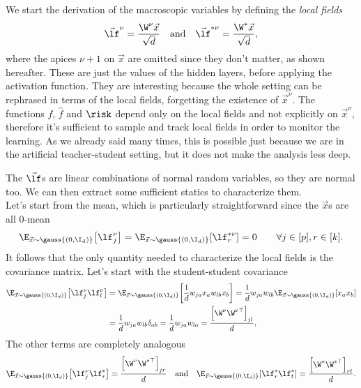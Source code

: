 We start the derivation of the macroscopic variables by defining the \emph{local fields}
\[
  \vec{\lf}^{\nu} = \frac{\W^{\nu}\vec{x}}{\sqrt{{d}}} \quad\text{and}\quad
  \vec{\lf}^{*\nu} = \frac{\W^{*}\vec{x}}{\sqrt{{d}}},
\]
where the apices \({\nu+1}\) on \(\vec{x}\) are omitted since they don't matter,
as shown hereafter. These are just the values of the hidden layers, before applying 
the activation function. They are interesting because the whole setting can be rephrased
in terms of the local fields, forgetting the existence of \(\vec{x}^\nu\).
The functions \(f\), \(\hat{f}\) and \(\risk\) depend only on the local fields and not explicitly
on \(\vec{x}^\nu\), therefore it's sufficient to sample and track local fields in order to monitor the learning.
As we already said many times, this is possible just because we are in the artificial
teacher-student setting, but it does not make the analysis less deep.

The \(\vec{\lf}\)s are linear combinations of normal random variables, so they are
normal too. We can then extract some sufficient statics to characterize them.\\
Let's start from the mean, which is particularly straightforward since the \(\vec{x}\)s
are all 0-mean
\[
  \E_{{\vec{x}\sim\gauss{(0,\I_d)}}}{\left[\lf_j^\nu\right]} = \E_{{\vec{x}\sim\gauss{(0,\I_d)}}}{\left[\lf_r^{*\nu}\right]} = 0
  \qquad \forall j\in[p], r\in[k].
\]
It follows that the only quantity needed to characterize the local fields is 
the covariance matrix. 
Let's start with the student-student covariance
\[\begin{split}
  \E_{{\vec{x}\sim\gauss{(0,\I_d)}}}{\left[\lf_j^\nu\lf_l^\nu\right]} &= 
  \E_{{\vec{x}\sim\gauss{(0,\I_d)}}}{\left[\frac1d w_{ja}x_a w_{lb}x_b\right]} =
  \frac1dw_{ja}w_{lb}\E_{{\vec{x}\sim\gauss{(0,\I_d)}}}{\left[x_ax_b\right]}\\ &= 
  \frac1dw_{ja}w_{lb} \delta_{ab} = \frac1dw_{ja}w_{la} = \frac{\left[\W^\nu\W^{\nu\top}\right]_{jl}}{d},\\
\end{split}\]
The other terms are completely analogous
\[
  \E_{{\vec{x}\sim\gauss{(0,\I_d)}}}{\left[\lf_j^\nu\lf_r^{*}\right]} = \frac{\left[\W^\nu\W^{*\top}\right]_{jr}}{d}
  \quad\text{and}\quad
  \E_{{\vec{x}\sim\gauss{(0,\I_d)}}}{\left[\lf_r^*\lf_t^{*}\right]} = \frac{\left[\W^*\W^{*\top}\right]_{rt}}{d}.
\]

